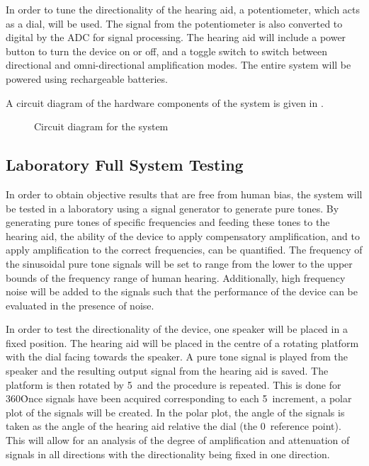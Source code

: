 \documentclass[10pt,twocolumn]{witseiepaper}
\begin{document}
In order to tune the directionality of the hearing aid, a potentiometer, which acts as a dial, will be used. The signal from the potentiometer is also converted to digital by the ADC for signal processing. The hearing aid will include a power button to turn the device on or off, and a toggle switch to switch between directional and omni-directional amplification modes. The entire system will be powered using rechargeable batteries. 

A circuit diagram of the hardware components of the system is given in .

\begin{figure}[h]
	\centering
	\caption{Circuit diagram for the system}
	\raggedright
	\label{fig:circuit}	
\end{figure}

\subsection{Laboratory Full System Testing} \label{sec:laboratory}
In order to obtain objective results that are free from human bias, the system will be tested in a laboratory using a signal generator to generate pure tones. By generating pure tones of specific frequencies and feeding these tones to the hearing aid, the ability of the device to apply compensatory amplification, and to apply amplification to the correct frequencies, can be quantified. The frequency of the sinusoidal pure tone signals will be set to range from the lower to the upper bounds of the frequency range of human hearing. Additionally, high frequency noise will be added to the signals such that the performance of the device can be evaluated in the presence of noise.

In order to test the directionality of the device, one speaker will be placed in a fixed position. The hearing aid will be placed in the centre of a rotating platform with the dial facing towards the speaker. A pure tone signal is played from the speaker and the resulting output signal from the hearing aid is saved. The platform is then rotated by 5\textdegree\ and the procedure is repeated. This is done for 360\textdegree\. Once signals have been acquired corresponding to each 5\textdegree\ increment, a polar plot of the signals will be created. In the polar plot, the angle of the signals is taken as the angle of the hearing aid relative the dial (the 0\textdegree\ reference point). This will allow for an analysis of the degree of amplification and attenuation of signals in all directions with the directionality being fixed in one direction.
\end{document}
